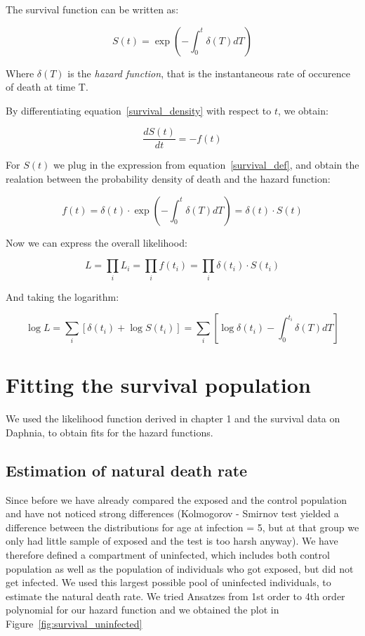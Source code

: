 \documentclass[10pt]{article}         %
\begin{document}
The survival function can be written as:

\begin{equation}
\label{survival_def}
S(t) = \exp(-\int_0^t{\delta(T)dT})
\end{equation}

Where $\delta(T)$ is the \textit{hazard function}, that is the instantaneous rate of occurence of death at time T.

By differentiating equation~\ref{survival_density} with respect to $t$, we obtain:

\begin{equation}
\frac{dS(t)}{dt} = - f(t)
\end{equation}

For $S(t)$ we plug in the expression from equation~\ref{survival_def}, and obtain the realation between the probability density of death and the hazard function:

\begin{equation}
f(t) = \delta(t) \cdot \exp(-\int_0^t{\delta(T)dT}) = \delta(t) \cdot S(t)
\end{equation}

Now we can express the overall likelihood:

\begin{equation}
L = \prod_i L_i = \prod_i f(t_i) = \prod_i \delta(t_i) \cdot S(t_i) 
\end{equation}

And taking the logarithm:

\begin{equation}
\log L = \sum_i [\delta(t_i) + \log S(t_i)] = \sum_i [\log \delta(t_i)  - \int_0^{t_i}{\delta(T)dT}]
\end{equation}

\section{Fitting the survival population}
\label{natural_mortality}
We used the likelihood function derived in chapter 1 and the survival data on Daphnia, to obtain fits for the hazard functions.

\subsection{Estimation of natural death rate}
\label{natural_mortality}

Since before we have already compared the exposed and the control population and have not noticed strong differences (Kolmogorov - Smirnov test yielded a difference between the distributions for age at infection = 5, but at that group we only had little sample of exposed and the test is too harsh anyway). We have therefore defined a compartment of uninfected, which includes both control population as well as the population of individuals who got exposed, but did not get infected. We used this largest possible pool of uninfected individuals, to estimate the natural death rate. We tried Ansatzes from 1st order to 4th order polynomial for our hazard function and we obtained the plot in Figure~\ref{fig:survival_uninfected}
\end{document}
